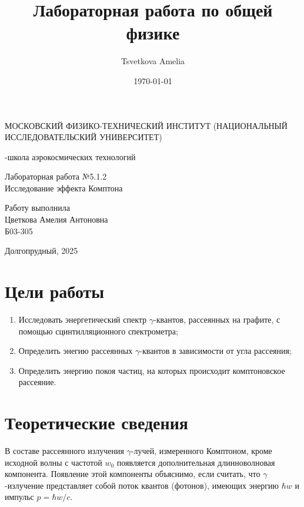 \documentclass[a4paper,12pt]{article}
\author{Tsvetkova Amelia}
\title{Лабораторная работа по общей физике}
\date{\today}
\begin{document}
\begin{titlepage}
    \newpage
    \begin{center}
    {\large МОСКОВСКИЙ ФИЗИКО-ТЕХНИЧЕСКИЙ ИНСТИТУТ (НАЦИОНАЛЬНЫЙ ИССЛЕДОВАТЕЛЬСКИЙ УНИВЕРСИТЕТ)}
    \vspace{1cm}

    {-школа аэрокосмических технологий}
    \vspace{6em}
    \end{center}
    
    \vspace{1.2em}

    \begin{center}
    \Large Лабораторная работа №5.1.2 \\
    Исследование эффекта Комптона
    \linebreak
    \end{center}
    
    \vspace{11em}
    
    \begin{flushright}
                       {\large Работу выполнила\\
                       Цветкова Амелия Антоновна\\
                       Б03-305 }
    \end{flushright}

    \vspace{\fill}

    \begin{center}
    Долгопрудный, 2025
    \end{center}

    \end{titlepage}

\section{Цели работы}
\begin{enumerate}
    \item Исследовать энергетический спектр $\gamma$-квантов, рассеянных на графите, с помощью сцинтилляционного спектрометра;
    \item Определить энегию рассеянных $\gamma$-квантов в зависимости от угла рассеяния;
    \item Определить энергию покоя частиц, на которых происходит комптоновское рассеяние.
\end{enumerate}

\section{Теоретические сведения}
В составе рассеянного излучения $\gamma$-лучей, измеренного Комптоном, кроме исходной волны с частотой $w_0$ появляется дополнительная длинноволновая компонента. Появление этой компоненты объяснимо, если считать, что $\gamma$-излучение представляет собой поток квантов (фотонов), имеющих энергию $\hbar w$ и импульс $p=\hbar w/c$.
\end{document}
